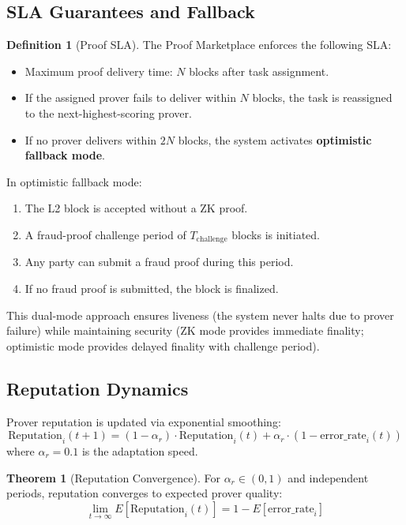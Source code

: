 \documentclass[12pt,a4paper]{article}
\theoremstyle{definition}
\newtheorem{definition}{Definition}[section]
\newtheorem{theorem}{Theorem}[section]
\theoremstyle{remark}
\begin{document}
\subsection{SLA Guarantees and Fallback}

\begin{definition}[Proof SLA]
The Proof Marketplace enforces the following SLA:
\begin{itemize}[nosep]
    \item Maximum proof delivery time: $N$ blocks after task assignment.
    \item If the assigned prover fails to deliver within $N$ blocks, the task is reassigned to the next-highest-scoring prover.
    \item If no prover delivers within $2N$ blocks, the system activates \textbf{optimistic fallback mode}.
\end{itemize}
\end{definition}

In optimistic fallback mode:
\begin{enumerate}[nosep]
    \item The L2 block is accepted without a ZK proof.
    \item A fraud-proof challenge period of $T_{\text{challenge}}$ blocks is initiated.
    \item Any party can submit a fraud proof during this period.
    \item If no fraud proof is submitted, the block is finalized.
\end{enumerate}

This dual-mode approach ensures liveness (the system never halts due to prover failure) while maintaining security (ZK mode provides immediate finality; optimistic mode provides delayed finality with challenge period).

\subsection{Reputation Dynamics}

Prover reputation is updated via exponential smoothing:
\begin{equation}
\text{Reputation}_i(t+1) = (1 - \alpha_r) \cdot \text{Reputation}_i(t) + \alpha_r \cdot (1 - \text{error\_rate}_i(t))
\end{equation}
where $\alpha_r = 0.1$ is the adaptation speed.

\begin{theorem}[Reputation Convergence]
\label{thm:reputation-convergence}
For $\alpha_r \in (0,1)$ and independent periods, reputation converges to expected prover quality:
\begin{equation}
\lim_{t \to \infty} E[\text{Reputation}_i(t)] = 1 - E[\text{error\_rate}_i]
\end{equation}
\end{theorem}
\end{document}
